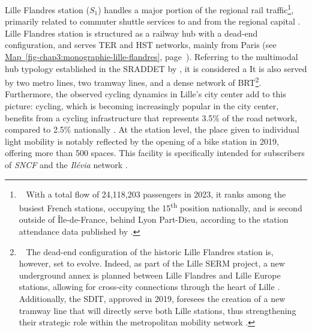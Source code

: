 \begin{refsegment}
Lille Flandres station (\(S_1\)) handles a major portion of the regional rail traffic\footnote{~
    With a total flow of 24,118,203 passengers in 2023, it ranks among the busiest French stations, occupying the 15\textsuperscript{th} position nationally, and is second outside of Île-de-France, behind Lyon Part-Dieu, according to the station attendance data published by \textcolor{blue}{\textcite{sncf_frequentation_2024}}.
}, primarily related to commuter shuttle services to and from the regional capital \textcolor{blue}{\autocite[12]{hasiak_estimation_2018}}. Lille Flandres station is structured as a railway hub with a dead-end configuration, and serves \acrshort{TER} and \acrshort{HST} networks, mainly from Paris (see \hyperref[fig-chap3:monographie-lille-flandres]{Map~\ref{fig-chap3:monographie-lille-flandres}}, page~\pageref{fig-chap3:monographie-lille-flandres}). Referring to the multimodal hub typology established in the \acrshort{SRADDET} by \textcolor{blue}{\textcite[81]{region_hauts-de-france_sraddet_2024}}, it is considered a  It is also served by two metro lines, two tramway lines, and a dense network of \acrshort{BRT}\footnote{~
    The dead-end configuration of the historic Lille Flandres station is, however, set to evolve. Indeed, as part of the Lille \acrfull{SERM} project, a new underground annex is planned between Lille Flandres and Lille Europe stations, allowing for cross-city connections through the heart of Lille \textcolor{blue}{\textcite{metropole_europeenne_de_lille_construisons_nodate}}. Additionally, the \acrfull{SDIT}, approved in 2019, foresees the creation of a new tramway line that will directly serve both Lille stations, thus strengthening their strategic role within the metropolitan mobility network \textcolor{blue}{\textcite{metropole_europeenne_de_lille_service_2023}}.
}. Furthermore, the observed cycling dynamics in Lille's city center add to this picture: cycling, which is becoming increasingly popular in the city center, benefits from a cycling infrastructure that represents 3.5\% of the road network, compared to 2.5\% nationally \textcolor{blue}{\autocite[103]{cordier_parts_2021}}. At the station level, the place given to individual light mobility is notably reflected by the opening of a bike station in 2019, offering more than 500 spaces. This facility is specifically intended for subscribers of \textsl{SNCF} and the \textsl{Ilévia} network \textcolor{blue}{\autocite[]{adav_velostation_nodate}}.%


\end{refsegment}
